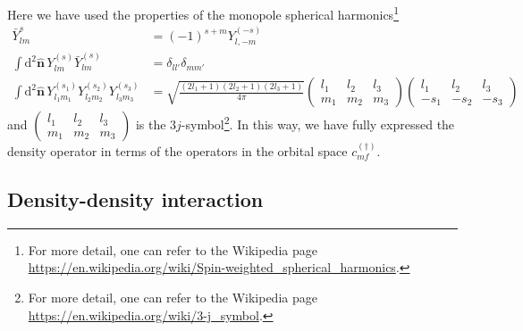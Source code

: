 \documentclass{timesjhep}
\begin{document}
Here we have used the properties of the monopole spherical harmonics\footnote{For more detail, one can refer to the Wikipedia page \url{https://en.wikipedia.org/wiki/Spin-weighted_spherical_harmonics}.}
\begin{subequations}
\begin{align}
    \bar{Y}_{lm}^{s}&=(-1)^{s+m}Y_{l,-m}^{(-s)}\\
    \int\mathrm{d}^2\hat{\mathbf{n}}\,Y_{lm}^{(s)}\bar{Y}_{lm}^{(s)}&=\delta_{ll'}\delta_{mm'}\\
    \int\mathrm{d}^2\hat{\mathbf{n}}\,Y_{l_1m_1}^{(s_1)}Y_{l_2m_2}^{(s_2)}Y_{l_3m_3}^{(s_3)}&=\sqrt{\frac{(2l_1+1)(2l_2+1)(2l_3+1)}{4\pi}}\begin{pmatrix}l_1&l_2&l_3\\m_1&m_2&m_3\end{pmatrix}\begin{pmatrix}l_1&l_2&l_3\\-s_1&-s_2&-s_3\end{pmatrix}     
\end{align} 
\end{subequations}
and $\begin{pmatrix}l_1&l_2&l_3\\m_1&m_2&m_3\end{pmatrix}$ is the $3j$-symbol\footnote{For more detail, one can refer to the Wikipedia page \url{https://en.wikipedia.org/wiki/3-j_symbol}.}. In this way, we have fully expressed the density operator in terms of the operators in the orbital space $c^{(\dagger)}_{mf}$. 

\subsection{Density-density interaction}
\end{document}
